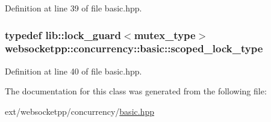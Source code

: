 Definition at line 39 of file basic.\+hpp.

\hypertarget{classwebsocketpp_1_1concurrency_1_1basic_ac5f4f16695c8c578face2e4dac291b93}{}
\subsubsection[{scoped\+\_\+lock\+\_\+type}]{\setlength{\rightskip}{0pt plus 5cm}typedef lib\+::lock\+\_\+guard$<${\bf mutex\+\_\+type}$>$ {\bf websocketpp\+::concurrency\+::basic\+::scoped\+\_\+lock\+\_\+type}}\label{classwebsocketpp_1_1concurrency_1_1basic_ac5f4f16695c8c578face2e4dac291b93}


Definition at line 40 of file basic.\+hpp.



The documentation for this class was generated from the following file\+:\begin{DoxyCompactItemize}
\item 
ext/websocketpp/concurrency/\hyperlink{concurrency_2basic_8hpp}{basic.\+hpp}\end{DoxyCompactItemize}
